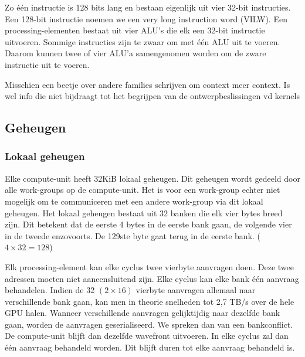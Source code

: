 Zo \'e\'en instructie is 128 bits lang en bestaan eigenlijk uit vier 32-bit instructies. Een 128-bit instructie noemen we een very long instruction word (VILW). Een processing-elementen bestaat uit vier ALU's die elk een 32-bit instructie uitvoeren. Sommige instructies zijn te zwaar om met \'e\'en ALU uit te voeren. Daarom kunnen twee of vier ALU'a samengenomen worden om de zware instructie uit te voeren.

Misschien een beetje over andere families schrijven om context meer context. Is wel info die niet bijdraagt tot het begrijpen van de ontwerpbeslissingen vd kernels




\subsection{Geheugen}

\subsubsection{Lokaal geheugen}
Elke compute-unit heeft 32KiB lokaal geheugen. Dit geheugen wordt gedeeld door alle work-groups  op de compute-unit. Het is voor een work-group echter niet mogelijk om te communiceren met een andere work-group via dit lokaal geheugen. Het lokaal geheugen bestaat uit 32 banken die elk vier bytes breed zijn. Dit betekent dat de eerste 4 bytes in de eerste bank gaan, de volgende vier in de tweede enzovoorts. De 129ste byte gaat terug in de eerste bank. ($4 \times 32 = 128$)

Elk processing-element kan elke cyclus twee vierbyte aanvragen doen. Deze twee adressen moeten niet aaneensluitend zijn. Elke cyclus kan elke bank \'e\'en aanvraag behandelen. Indien de 32 $(2 \times 16)$ vierbyte aanvragen allemaal naar verschillende bank gaan, kan men in theorie snelheden tot 2,7 TB/s over de hele GPU halen. Wanneer verschillende aanvragen gelijktijdig naar dezelfde bank gaan, worden de aanvragen geserialiseerd. We spreken dan van een bankconflict. De compute-unit blijft dan dezelfde wavefront uitvoeren. In elke cyclus zal dan \'e\'en aanvraag behandeld worden. Dit blijft duren tot elke aanvraag behandeld is.

